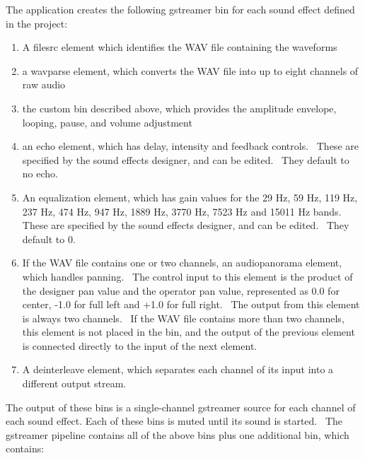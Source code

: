 \documentclass[letterpaper]{article}
\newcommand\liststyleLxviii{%
\renewcommand\theenumi{\arabic{enumi}}
\renewcommand\theenumii{\arabic{enumii}}
\renewcommand\theenumiii{\arabic{enumiii}}
\renewcommand\theenumiv{\arabic{enumiv}}
\renewcommand\labelenumi{\theenumi.}
\renewcommand\labelenumii{\theenumii.}
\renewcommand\labelenumiii{\theenumiii.}
\renewcommand\labelenumiv{\theenumiv.}
}
\begin{document}
The application creates the following gstreamer bin for each sound
effect defined in the project:

\liststyleLxviii
\begin{enumerate}
\item A filesrc element which identifies the WAV file containing the
waveforms
\item a wavparse element, which converts the WAV file into up to eight
channels of raw audio
\item the custom bin described above, which provides the amplitude
envelope, looping, pause, and volume adjustment
\item an echo element, which has delay, intensity and feedback controls.
\ These are specified by the sound effects designer, and can be edited.
\ They default to no echo.
\item An equalization element, which has gain values for the 29 Hz, 59
Hz, 119 Hz, 237 Hz, 474 Hz, 947 Hz, 1889 Hz, 3770 Hz, 7523 Hz and 15011
Hz bands. These are specified by the sound effects designer, and can be
edited. \ They default to 0.
\item If the WAV file contains one or two channels, an audiopanorama
element, which handles panning. \ The control input to this element is
the product of the designer pan value and the operator pan value,
represented as 0.0 for center, -1.0 for full left and +1.0 for full
right. \ The output from this element is always two channels. \ If the
WAV file contains more than two channels, this element is not placed in
the bin, and the output of the previous element is connected directly
to the input of the next element.
\item A deinterleave element, which separates each channel of its input
into a different output stream.
\end{enumerate}
The output of these bins is a single-channel gstreamer source for each
channel of each sound effect. Each of these bins is muted until its
sound is started. \ The gstreamer pipeline contains all of the above
bins plus one additional bin, which contains:
\end{document}
